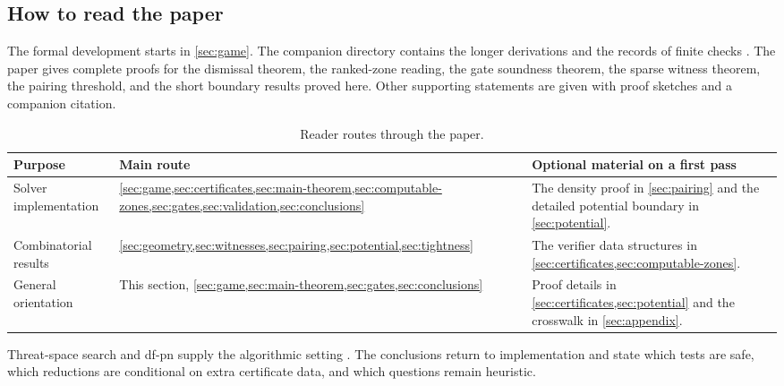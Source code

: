 \subsection{How to read the paper}

The formal development starts in \cref{sec:game}.  The companion directory
contains the longer derivations and the records of finite checks
\cite{hexobot-companions}.  The paper gives complete proofs for the dismissal
theorem, the ranked-zone reading, the gate soundness theorem, the sparse
witness theorem, the pairing threshold, and the short boundary results proved
here.  Other supporting statements are given with proof
sketches and a companion citation.

\begin{table}[tbp]
  \centering
  \small
  \begin{tabular}{@{}p{.20\linewidth}p{.31\linewidth}p{.39\linewidth}@{}}
    \toprule
    Purpose & Main route & Optional material on a first pass \\
    \midrule
    Solver implementation &
      \cref{sec:game,sec:certificates,sec:main-theorem,sec:computable-zones,sec:gates,sec:validation,sec:conclusions} &
      The density proof in \cref{sec:pairing} and the detailed potential
      boundary in \cref{sec:potential}. \\
    Combinatorial results &
      \cref{sec:geometry,sec:witnesses,sec:pairing,sec:potential,sec:tightness} &
      The verifier data structures in \cref{sec:certificates,sec:computable-zones}. \\
    General orientation &
      This section, \cref{sec:game,sec:main-theorem,sec:gates,sec:conclusions} &
      Proof details in \cref{sec:certificates,sec:potential} and the
      crosswalk in \cref{sec:appendix}. \\
    \bottomrule
  \end{tabular}
  \caption{Reader routes through the paper.}
  \label{tab:reader-routes}
\end{table}

Threat-space search and df-pn supply the algorithmic setting
\cite{allis-1994,nagai-2002}.  The conclusions return to implementation and
state which tests are safe, which reductions are conditional on extra
certificate data, and which questions remain heuristic.
